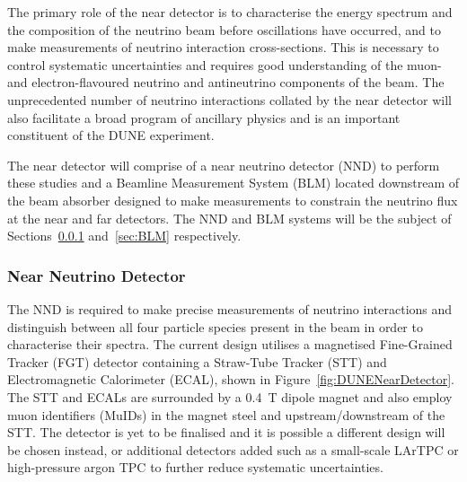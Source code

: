 The primary role of the near detector is to characterise the energy spectrum and the composition of the neutrino beam before oscillations have occurred, and to make measurements of neutrino interaction cross-sections.  This is necessary to control systematic uncertainties and requires good understanding of the muon- and electron-flavoured neutrino and antineutrino components of the beam.  The unprecedented number of neutrino interactions collated by the near detector will also facilitate a broad program of ancillary physics and is an important constituent of the DUNE experiment.

The near detector will comprise of a near neutrino detector (NND) to perform these studies and a Beamline Measurement System (BLM) located downstream of the beam absorber designed to make measurements to constrain the neutrino flux at the near and far detectors.  The NND and BLM systems will be the subject of Sections~\ref{sec:NND} and~\ref{sec:BLM} respectively.

\subsubsection{Near Neutrino Detector}\label{sec:NND}

The NND is required to make precise measurements of neutrino interactions and distinguish between all four particle species present in the beam in order to characterise their spectra.  The current design utilises a magnetised Fine-Grained Tracker (FGT) detector containing a Straw-Tube Tracker (STT) and Electromagnetic Calorimeter (ECAL), shown in Figure~\ref{fig:DUNENearDetector}.  The STT and ECALs are surrounded by a 0.4~T dipole magnet and also employ muon identifiers (MuIDs) in the magnet steel and upstream/downstream of the STT.  The detector is yet to be finalised and it is possible a different design will be chosen instead, or additional detectors added such as a small-scale LArTPC or high-pressure argon TPC to further reduce systematic uncertainties.

